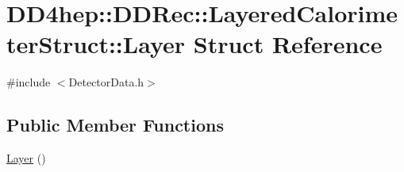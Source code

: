 \hypertarget{struct_d_d4hep_1_1_d_d_rec_1_1_layered_calorimeter_struct_1_1_layer}{
\section{DD4hep::DDRec::LayeredCalorimeterStruct::Layer Struct Reference}
\label{struct_d_d4hep_1_1_d_d_rec_1_1_layered_calorimeter_struct_1_1_layer}
}


{\ttfamily \#include $<$DetectorData.h$>$}\subsection*{Public Member Functions}
\begin{DoxyCompactItemize}
\item 
\hyperlink{struct_d_d4hep_1_1_d_d_rec_1_1_layered_calorimeter_struct_1_1_layer_ad13df3e5858587a746ce2d5029341010}{Layer} ()
\end{DoxyCompactItemize}
